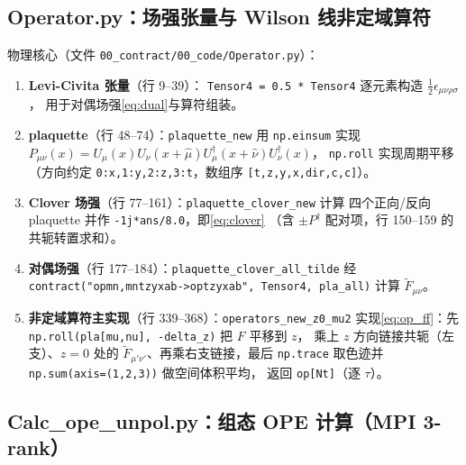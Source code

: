 \documentclass[UTF8,11pt]{ctexart}
\begin{document}
\subsection{Operator.py：场强张量与 Wilson 线非定域算符}
\label{sec:operator}

物理核心（文件 \texttt{00\_contract/00\_code/Operator.py}）：

\begin{enumerate}
  \item \textbf{Levi-Civita 张量}（行 9--39）：
  \texttt{Tensor4 = 0.5 * Tensor4} 逐元素构造 $\tfrac12\epsilon_{\mu\nu\rho\sigma}$，
  用于对偶场强\eqref{eq:dual}与算符组装。
  \item \textbf{plaquette}（行 48--74）：\texttt{plaquette\_new} 用
  \texttt{np.einsum} 实现 $P_{\mu\nu}(x)=U_\mu(x)U_\nu(x+\hat\mu)U^\dagger_\mu(x+\hat\nu)U^\dagger_\nu(x)$，
  \texttt{np.roll} 实现周期平移（方向约定 \texttt{0:x,1:y,2:z,3:t}，数组序 \texttt{[t,z,y,x,dir,c,c]}）。
  \item \textbf{Clover 场强}（行 77--161）：\texttt{plaquette\_clover\_new} 计算
  四个正向/反向 plaquette 并作 \texttt{-1j*ans/8.0}，即\eqref{eq:clover}
  （含 $\pm P^\dagger$ 配对项，行 150--159 的共轭转置求和）。
  \item \textbf{对偶场强}（行 177--184）：\texttt{plaquette\_clover\_all\_tilde}
  经 \texttt{contract("opmn,mntzyxab->optzyxab", Tensor4, pla\_all)} 计算 $\tilde F_{\mu\nu}$。
  \item \textbf{非定域算符主实现}（行 339--368）：\texttt{operators\_new\_z0\_mu2}
  实现\eqref{eq:op_ff}：先 \texttt{np.roll(pla[mu,nu], -delta\_z)} 把 $F$ 平移到 $z$，
  乘上 $z$ 方向链接共轭（左支）、$z=0$ 处的 $\tilde F_{\mu'\nu'}$、再乘右支链接，最后
  \texttt{np.trace} 取色迹并 \texttt{np.sum(axis=(1,2,3))} 做空间体积平均，
  返回 \texttt{op[Nt]}（逐 $\tau$）。
\end{enumerate}

\subsection{Calc\_ope\_unpol.py：组态 OPE 计算（MPI 3-rank）}
\label{sec:calc_ope}
\end{document}
